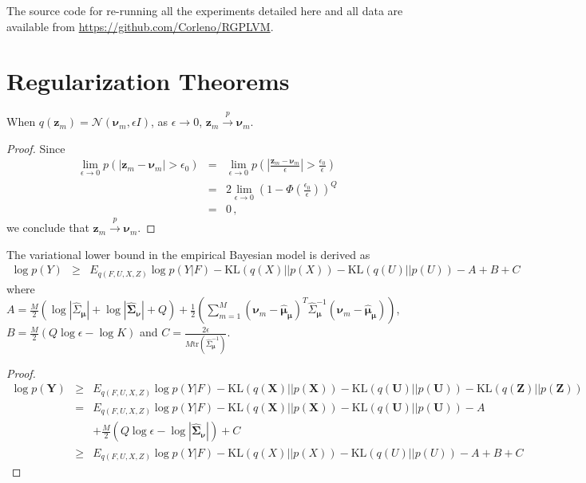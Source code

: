 \appendix
The source code for re-running all the experiments detailed here and all data are available from \url{https://github.com/Corleno/RGPLVM}.

\section{Regularization Theorems} 
\label{sec: rt}
\begin{lemma}
	When $q(\bm z_m) = \mathcal{N}(\bm \nu_m, \epsilon I)$, as $\epsilon \rightarrow 0$, $\bm z_m \stackrel{p}{\rightarrow} \bm \nu_m$.
\end{lemma}

\begin{proof} Since
	\begin{eqnarray}
	\lim\limits_{\epsilon \rightarrow 0} p(|\bm z_m - \bm \nu_m| > \epsilon_0) & = & \lim\limits_{\epsilon \rightarrow 0} p(|\frac{\bm z_m - \bm \nu_m}{\epsilon}| > \frac{\epsilon_0}{\epsilon}) \nonumber \\
	& = & 2\lim\limits_{\epsilon \rightarrow 0} (1 - \Phi(\frac{\epsilon_0}{\epsilon}))^{Q} \nonumber \\
	& = & 0 \,, \nonumber
	\end{eqnarray}
	we conclude that $\bm z_m \stackrel{p}{\rightarrow} \bm \nu_m$.
\end{proof}

\begin{lemma}
	The variational lower bound in the empirical Bayesian model is derived as 
	\begin{eqnarray}
	\log p(Y) & \geq & E_{q(F, U, X, Z)}\log p(Y|F) - \mathrm{KL}(q(X)||p(X)) - \mathrm{KL}(q(U)||p(U)) - A + B + C \nonumber
	\end{eqnarray}
	where $A = \frac{M}{2}(\log |\hat{\Sigma}_{\bm \mu}| + \log|\hat{\bm\Sigma}_{\bm\nu}| + Q) + \frac{1}{2}\left(\sum_{m = 1}^M(\bm\nu_m - \hat{\bm \mu}_{\bm \mu})^T\hat{\Sigma}_{\bm\mu}^{-1}(\bm\nu_m - \hat{\bm \mu}_{\bm \mu})\right)$, $B = \frac{M}{2}(Q\log\epsilon-\log K)$ and $C = \frac{2\epsilon}{M\mathrm{tr}(\hat{\Sigma}_{\bm\mu}^{-1})}$.
\end{lemma}

\begin{proof}
	{\footnotesize
		\begin{eqnarray}
		\log p(\bm Y) & \geq &  E_{q(F, U, X, Z)}\log p(Y|F) - \mathrm{KL}(q(\bm X)|| p(\bm X)) - \mathrm{KL}(q(\bm U) ||p(\bm U )) -\mathrm{KL}(q(\bm Z)|| p(\bm Z)) \nonumber \\
		& = & E_{q(F, U, X, Z)}\log p(Y|F) - \mathrm{KL}(q(\bm X)|| p(\bm X)) - \mathrm{KL}(q(\bm U) ||p(\bm U )) - A \nonumber \\
		& & + \frac{M}{2}(Q\log\epsilon-\log |\hat{\bm\Sigma}_{\bm \nu}|) + C \nonumber \\
		& \geq & E_{q(F, U, X, Z)}\log p(Y|F) - \mathrm{KL}(q(X)||p(X)) - \mathrm{KL}(q(U)||p(U)) - A + B + C \nonumber
		\end{eqnarray}
	}
\end{proof}

